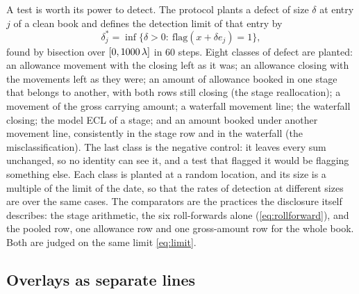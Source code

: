 A test is worth its power to detect.
The protocol plants a defect of size $\delta$ at entry $j$ of a clean book and defines the detection limit of that entry by
\begin{equation}
\delta^{*}_{j}=\inf\big\{\delta>0:\ \mathrm{flag}(x+\delta e_j)=1\big\},
\label{eq:limit-entry}
\end{equation}
found by bisection over $[0,1000\,\lambda]$ in 60 steps.
Eight classes of defect are planted: an allowance movement with the closing left as it was; an allowance closing with the movements left as they were; an amount of allowance booked in one stage that belongs to another, with both rows still closing (the stage reallocation); a movement of the gross carrying amount; a waterfall movement line; the waterfall closing; the model ECL of a stage; and an amount booked under another movement line, consistently in the stage row and in the waterfall (the misclassification).
The last class is the negative control: it leaves every sum unchanged, so no identity can see it, and a test that flagged it would be flagging something else.
Each class is planted at a random location, and its size is a multiple of the limit of the date, so that the rates of detection at different sizes are over the same cases.
The comparators are the practices the disclosure itself describes: the stage arithmetic, the six roll-forwards alone (\eqref{eq:rollforward}), and the pooled row, one allowance row and one gross-amount row for the whole book.
Both are judged on the same limit \eqref{eq:limit}.

\subsection{Overlays as separate lines}
\label{sec:method-overlays}


